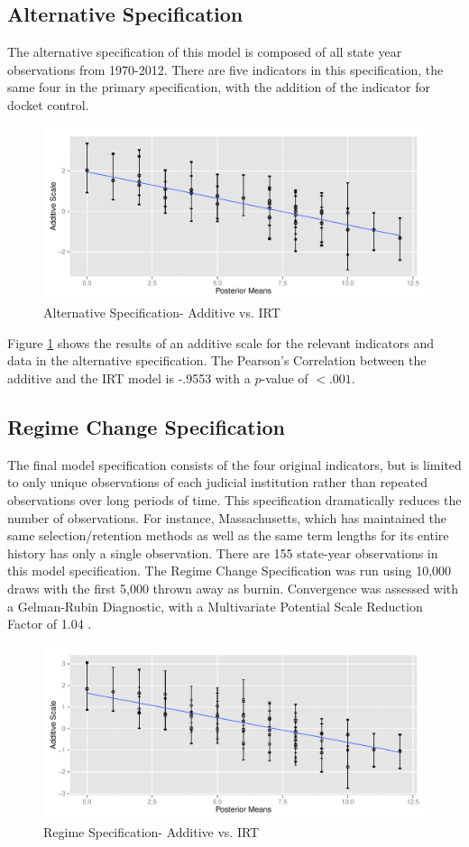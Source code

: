 \documentclass[JohnsonMADraft2]{subfiles}
\begin{document}
\subsection{Alternative Specification}
The alternative specification of this model is composed of all state year observations from 1970-2012. There are five indicators in this specification, the same four in the primary specification, with the addition of the indicator for docket control.  

\begin{figure}
\centering
\caption{Alternative Specification- Additive vs. IRT}
\label{fig:fiveind_additive_ggplot}
\includegraphics[width=0.7\linewidth]{graphics/fiveind/fiveind_additive_ggplot}
\end{figure}

Figure \ref{fig:fiveind_additive_ggplot} shows the results of an additive scale for the relevant indicators and data in the alternative specification.  The Pearson's Correlation between the additive and the IRT model is -.9553 with a $p$-value of $<.001$.

\subsection{Regime Change Specification}
The final model specification consists of the four original indicators, but is limited to only unique observations of each judicial institution rather than repeated observations over long periods of time.  This specification dramatically reduces the number of observations.  For instance, Massachusetts, which has maintained the same selection/retention methods as well as the same term lengths for its entire history has only a single observation.  There are 155 state-year observations in this model specification.  The Regime Change Specification was run using 10,000 draws with the first 5,000 thrown away as burnin.  Convergence was assessed with a Gelman-Rubin Diagnostic, with a Multivariate Potential Scale Reduction Factor of 1.04 \citep{Gelman1992}.  

\begin{figure}
\centering
\caption{Regime Specification- Additive vs. IRT}
\label{fig:regime_additive_ggplot.pdf}
\includegraphics[width=0.7\linewidth]{graphics/regime/regime_additive_ggplot}
\end{figure}
\end{document}
